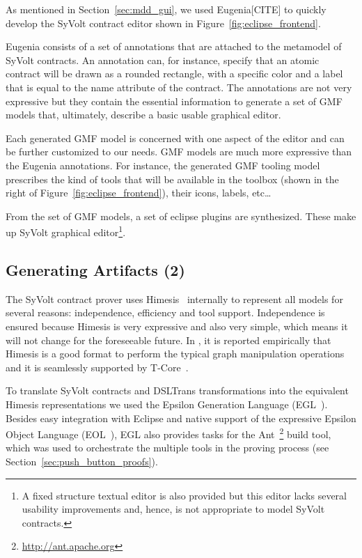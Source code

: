 As mentioned in Section~\ref{sec:mdd_gui}, we used Eugenia[CITE] to quickly develop the SyVolt contract editor shown in Figure~\ref{fig:eclipse_frontend}.

Eugenia consists of a set of annotations that are attached to the metamodel of
SyVolt contracts. An annotation can, for instance, specify that an atomic contract will be drawn as a rounded rectangle, with a specific color and a label that is equal to the name attribute of the contract.
The annotations are not very expressive but they contain the essential information to generate a set of GMF models that, ultimately, describe a basic usable graphical editor. 

Each generated GMF model is concerned with one aspect of the editor and can be further customized to our needs. GMF models are much more expressive than the Eugenia annotations.
For instance, the generated GMF tooling model prescribes the kind of tools that
will be available in the toolbox (shown in the right of
Figure~\ref{fig:eclipse_frontend}), their icons, labels, etc\ldots

From the set of GMF models, a set of eclipse plugins are synthesized.
These make up SyVolt graphical editor\footnote{A fixed structure textual editor is also provided but this editor lacks several usability improvements and, hence, is not appropriate to model SyVolt contracts.}.


\subsection{Generating Artifacts (2) }

The SyVolt contract prover uses Himesis~\cite{Provost2006} internally to represent all models for several reasons: independence, efficiency and tool support.
Independence is ensured because Himesis is very expressive and also very simple, which means it will not change for the foreseeable future. 
In \cite{Syriani2010b}, it is reported empirically that Himesis is a good format to perform the typical graph manipulation operations and it is seamlessly supported by T-Core~\cite{Syriani2010a}.

To translate SyVolt contracts and DSLTrans transformations into the equivalent Himesis representations we used the Epsilon Generation Language (EGL~\cite{Rose2008}).
Besides easy integration with Eclipse and native support of the expressive Epsilon Object Language (EOL~\cite{Kolovos}), EGL also provides tasks for the Ant~\footnote{\url{http://ant.apache.org}} build tool, which was used to orchestrate the multiple tools in the proving process (see Section~\ref{sec:push_button_proofs}).

